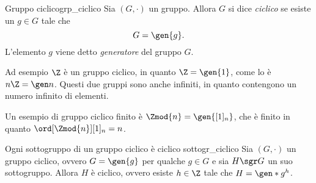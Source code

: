 \begin{definition}
    {Gruppo ciclico}{grp_ciclico}
    Sia $(G, \cdot)$ un gruppo. 
    Allora $G$ si dice \emph{ciclico} se esiste un $g \in G$ tale che \[
        G = \gen{g}.    
    \]
    L'elemento $g$ viene detto \emph{generatore} del gruppo $G$.
\end{definition}

Ad esempio $\Z$ è un gruppo ciclico, in quanto $\Z = \gen{1}$, come lo è $n\Z = \gen n$. Questi due gruppi sono anche infiniti, in quanto contengono un numero infinito di elementi.

Un esempio di gruppo ciclico finito è $\Zmod{n} = \gen{[1]_n}$, che è finito in quanto $\ord[\Zmod{n}]{[1]_n} = n$.

\begin{theorem}
    {Ogni sottogruppo di un gruppo ciclico è ciclico} {sottogr_ciclico}
    Sia $(G, \cdot)$ un gruppo ciclico, ovvero $G = \gen{g}$ per qualche $g \in G$ e sia $H \sgr G$ un suo sottogruppo.
    Allora $H$ è ciclico, ovvero esiste $h \in \Z$ tale che $H = \gen*{g^h}$.
\end{theorem}
